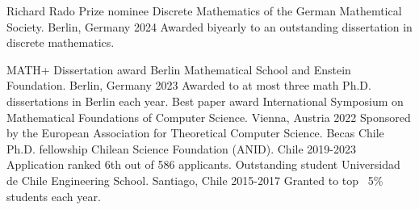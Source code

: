
\begin{cvhonors}




 \cvhonor
 {Richard Rado Prize nominee} %
 {Discrete Mathematics of the German Mathemtical Society.} %
 {Berlin, Germany} %
 {2024} %
 {Awarded biyearly to an outstanding dissertation in discrete mathematics.} %
%  


 \cvhonor
 {MATH+ Dissertation award} %
 {Berlin Mathematical School and Enstein Foundation.} %
 {Berlin, Germany} %
 {2023} %
 {Awarded to at most three math Ph.D. dissertations in Berlin each year.} %
%  
  \cvhonor
    {Best paper award} %
    {International Symposium on Mathematical Foundations of Computer Science.} %
    {Vienna, Austria} %
    {2022} %
    {Sponsored by the European Association for Theoretical Computer Science.} %
  \cvhonor
    {Becas Chile Ph.D. fellowship} %
    {Chilean Science Foundation (ANID).} %
    {Chile} %
    {2019-2023} %
    {Application ranked 6th out of 586 applicants.} %
  \cvhonor
    {Outstanding student} %
    {Universidad de Chile Engineering School.} %
    {Santiago, Chile} %
    {2015-2017} %
    {Granted to top ~5\% students each year.} %
\end{cvhonors}

